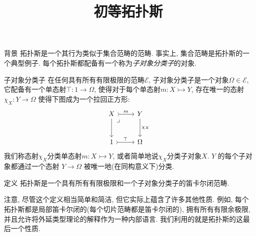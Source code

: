 \documentclass[aspectratio=169,xcolor=dvipsnames]{beamer}
\title{初等拓扑斯}
\date{}
\newcommand\calE{\mathcal{E}}
\begin{document}
\begin{frame}
    \titlepage
\end{frame}

\begin{frame}{背景}
拓扑斯是一个其行为类似于集合范畴的范畴. 事实上, 集合范畴是拓扑斯的一个典型例子. 每个拓扑斯都配备有一个称为\emph{子对象分类子}的对象.
\end{frame}

\begin{frame}{子对象分类子}
  在任何具有所有有限极限的范畴$\calE$, 子对象分类子是一个对象$\Omega\in\calE$, 它配备有一个单态射$\top : 1 \to \Omega$, 使得对于每个单态射$m:X\rightarrowtail Y$, 存在唯一的态射$\chi_{X} : Y\to\Omega$ 使得下图成为一个拉回正方形:\[
  \begin{tikzcd}[row sep=large]
  X \arrow[r,tail,"m"] \arrow[dr,phantom,"\lrcorner",very near start] \arrow[d] & Y \arrow[d,"\chi_{X}"] \\
  1 \arrow[r,tail,"\top"] & \Omega
  \end{tikzcd} \]
  我们称态射$\chi_{X}$分类单态射$m:X\rightarrowtail Y$, 或者简单地说$\chi_{X}$分类子对象$X$. $Y$ 的每个子对象都通过一个态射 $Y \to \Omega$ 被唯一地(在同构意义下)分类.
\end{frame}

\begin{frame}[shrink]{定义}
   拓扑斯是一个具有所有有限极限和一个子对象分类子的笛卡尔闭范畴.
   
\bigskip
   注意, 尽管这个定义相当简单和简洁, 但它实际上蕴含了许多其他性质. 例如, 每个拓扑斯都是局部笛卡尔闭的(每个切片范畴都是笛卡尔闭的), 拥有所有有限余极限, 并且允许将外延类型理论的解释作为一种内部语言. 我们利用的就是拓扑斯的这最后一个性质.
\end{frame}
\end{document}
